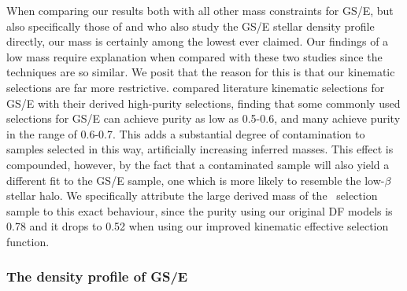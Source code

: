 When comparing our results both with all other mass constraints for GS/E, but also specifically those of \textcite{han22} and \textcite{mackereth20} who also study the GS/E stellar density profile directly, our mass is certainly among the lowest ever claimed. Our findings of a low mass require explanation when compared with these two studies since the techniques are so similar. We posit that the reason for this is that our kinematic selections are far more restrictive. \cite{lane22} compared literature kinematic selections for GS/E with their derived high-purity selections, finding that some commonly used selections for GS/E can achieve purity as low as 0.5-0.6, and many achieve purity in the range of 0.6-0.7. This adds a substantial degree of contamination to samples selected in this way, artificially increasing inferred masses. This effect is compounded, however, by the fact that a contaminated sample will also yield a different fit to the GS/E sample, one which is more likely to resemble the low-$\beta$ stellar halo.  We specifically attribute the large derived mass of the \JRLz\ selection sample to this exact behaviour, since the purity using our original DF models is 0.78 and it drops to 0.52 when using our improved kinematic effective selection function.

\subsubsection{The density profile of GS/E}

